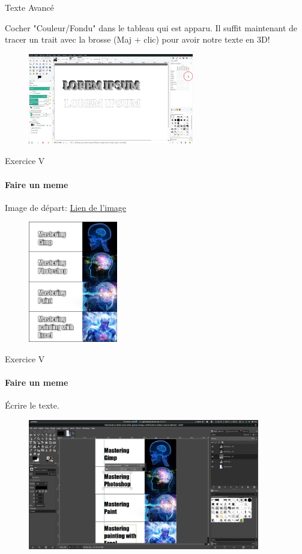 \documentclass[10pt,svgnames,usenames,table]{beamer}
\begin{document}
\begin{frame}{Texte Avancé}
\begin{enumerate}
{			Cocher "Couleur/Fondu" dans le tableau qui est apparu. Il suffit maintenant de tracer un trait avec la brosse (Maj + clic) pour avoir notre texte en 3D!		
			\begin{figure}
			\centering
			\includegraphics[height=150px]{Images/text/3D4}
			\end{figure}
		}	
		\end{enumerate}
\end{frame}

\begin{frame}{Exercice V}
\framesubtitle{Faire un meme}
Image de départ: \href{http://louvainlinux.github.io/atelier-gimp/src/Images/text/meme_template.jpg}{Lien de l'image}
	\begin{figure}
		\centering
		\includegraphics[height=200px]{Images/text/meme}
	\end{figure}
\end{frame}

\begin{frame}{Exercice V}
\framesubtitle{Faire un meme}
	Écrire le texte.
	\begin{figure}
		\centering
		\includegraphics[width=0.90\textwidth]{Images/text/meme_txt}
	\end{figure}
\end{frame}
\end{document}
